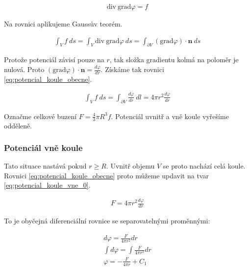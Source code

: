 \documentclass{book}
\newcommand{\vect}[1]{\boldsymbol{#1}}
\newcommand{\grad}{\mathrm{grad}}
\newcommand{\diverg}{\mathrm{div}}
\begin{document}
\begin{equation}
\begin{split}
\diverg \ \grad \varphi = f
\end{split}
\end{equation}

Na rovnici aplikujeme Gaussův teorém.

\begin{equation}
\begin{split}
\int_V f \ ds = \int_V \diverg \ \grad \varphi \ ds = \int_{\partial V} (\grad \varphi) \cdot \vect{n} \ ds
\end{split}
\end{equation}

Protože potenciál závisí pouze na \(r\), tak složka gradientu kolmá na poloměr je nulová. Proto \((\grad \varphi) \cdot \vect{n} = \frac{d \varphi}{dr}\).
Získáme tak rovnici \eqref{eq:potencial_koule_obecne}.

\begin{equation}
\label{eq:potencial_koule_obecne}
\begin{split}
\int_V f \ ds = \int_{\partial V} \frac{d \varphi}{dr} \ dl = 4 \pi r^2 \frac{d \varphi}{dr}
\end{split}
\end{equation}

Označme celkové buzení \(F = \frac{4}{3} \pi R^3 f\).
Potenciál uvnitř a vně koule vyřešíme odděleně.

\subsubsection{Potenciál vně koule}

Tato situace nastává pokud \(r \geq R\). Uvnitř objemu \(V\) se proto nachází celá koule. Rovnici \eqref{eq:potencial_koule_obecne} proto můžeme updavit na tvar \eqref{eq:potencial_koule_vne_0}.

\begin{equation}
\label{eq:potencial_koule_vne_0}
\begin{split}
F = 4 \pi r^2 \frac{d \varphi}{dr}
\end{split}
\end{equation}

To je obyčejná diferenciální rovnice se separovatelnými proměnnými:

\begin{equation}
\label{eq:potencial_koule_vne_1}
\begin{split}
d \varphi = \frac{F}{4 \pi r^2} dr \\
\int d \varphi = \int \frac{F}{4 \pi r^2} dr \\
\varphi = -\frac{F}{4 \pi r} + C_1 \\
\end{split}
\end{equation}
\end{document}

